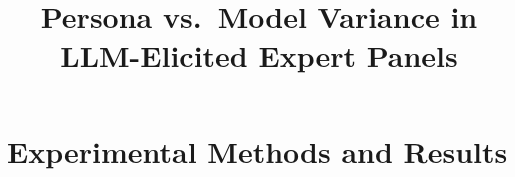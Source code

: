 \documentclass[11pt]{article}
\title{Persona vs.\ Model Variance in LLM-Elicited Expert Panels}
\author{}
\date{}
\begin{document}
\maketitle
\section{Experimental Methods and Results}

\end{document}
